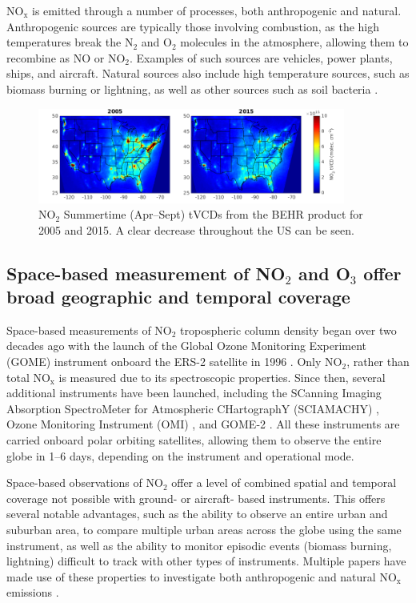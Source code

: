 \documentclass[a4paper,10pt,oneside]{article}
\newcommand{\ce}[1]{$\mathrm{#1}$}
\begin{document}
\begin{sloppy}
\ce{NO_x} is emitted through a number of processes, both anthropogenic and natural. Anthropogenic sources are typically those involving combustion, as the high temperatures break the \ce{N_2} and \ce{O_2} molecules in the atmosphere, allowing them to recombine as \ce{NO} or \ce{NO_2}. Examples of such sources are vehicles, power plants, ships, and aircraft. Natural sources also include high temperature sources, such as biomass burning or lightning, as well as other sources such as soil bacteria \cite{monks-beirle}.

\begin{figure}
\centering
\includegraphics[width=0.9\textwidth]{figs/no2vcds.png} 
\caption{\ce{NO_2} Summertime (Apr--Sept) tVCDs from the BEHR product for 2005 and 2015. A clear decrease throughout the US can be seen.}
\label{fig:sat-obs}
\end{figure}

\subsection{Space-based measurement of NO$_2$ and O$_3$ offer broad geographic and temporal coverage}

Space-based measurements of \ce{NO_2} tropospheric column density began over two decades ago with the launch of the Global Ozone Monitoring Experiment (GOME) instrument onboard the ERS-2 satellite in 1996 \cite{burrows99}. Only \ce{NO_2}, rather than total \ce{NO_x} is measured due to its spectroscopic properties. Since then, several additional instruments have been launched, including the SCanning Imaging Absorption SpectroMeter for Atmospheric CHartographY (SCIAMACHY) \cite{bovensmann99}, Ozone Monitoring Instrument (OMI) \cite{levelt06}, and GOME-2 \cite{callies00}. All these instruments are carried onboard polar orbiting satellites, allowing them to observe the entire globe in 1--6 days, depending on the instrument and operational mode.

Space-based observations of \ce{NO_2} offer a level of combined spatial and temporal coverage not possible with ground- or aircraft- based instruments.  This offers several notable advantages, such as the ability to observe an entire urban and suburban area, to compare multiple urban areas across the globe using the same instrument, as well as the ability to monitor episodic events (biomass burning, lightning) difficult to track with other types of instruments.  Multiple papers have made use of these properties to investigate both anthropogenic \cite{ding15, lamsal15, tong15, huang14, vinken14, gu13, miyazaki12, russell12, lin10, kim09} and natural \ce{NO_x} emissions \cite{miyazaki14, beirle10, castellanos14, mebust14, mebust13, zorner16}.


\end{sloppy}
\end{document}
